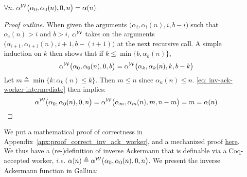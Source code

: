 \begin{thm} \label{thm: inv-ack-worker-correct}
	\href{https://github.com/inv-ack/inv-ack/blob/7270e64a2600b771f2b1b1b151f7d13fb2ae6c97/inv_ack.v#L199-L231}{\color{blue}\coq}
	$\forall n.~\alpha^{\mathcal{W}}\big(\alpha_0, \alpha_0(n), 0, n\big) = \alpha(n)$.
\end{thm}
\begin{proof}[Proof outline]
	When given the arguments $\big(\alpha_i, \alpha_i(n), i, b - i\big)$ such that $\alpha_i(n) > i$ and $b > i$, $\alpha^{\mathcal{W}}$ takes on the arguments $\big(\alpha_{i+1}, \alpha_{i+1}(n), i+1, b - (i+1)\big)$ at the next recursive call. A simple induction on $k$ then shows that if $k\le \min\big\{b, \alpha_k(n)\big\}$,
	\begin{equation} \label{eq: inv-ack-worker-intermediate}
	\alpha^{\mathcal{W}}\big(\alpha_0, \alpha_0(n), 0, b\big) = \alpha^{\mathcal{W}}\big(\alpha_k, \alpha_k(n), k, b-k\big)
	\end{equation}
	Let $m \triangleq \min\big\{k : \alpha_k(n) \le k \}$. Then $m\le n$ since $\alpha_n(n)\le n$. \eqref{eq: inv-ack-worker-intermediate} then implies:
	$$ \alpha^{\mathcal{W}}\big(\alpha_0, \alpha_0(n), 0, n\big) = \alpha^{\mathcal{W}}\big(\alpha_m, \alpha_m(n), m, n - m\big) = m = \alpha(n) $$
\end{proof}
\noindent We put a mathematical proof of correctness in Appendix~\ref{apx:proof_correct_inv_ack_worker}, and a mechanized proof
	\href{https://github.com/inv-ack/inv-ack/blob/7270e64a2600b771f2b1b1b151f7d13fb2ae6c97/inv_ack.v#L163-L231}{\color{blue}here}.
We thus have a (re-)definition of inverse Ackermann that is %
definable via a Coq-accepted worker, \emph{i.e.} $\alpha(n) \triangleq \alpha^{\mathcal{W}}\big(\alpha_0, \alpha_0(n), 0, n\big)$. We present the inverse
Ackermann function in Gallina:

